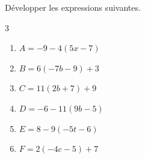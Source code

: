 {%
\begin{Exercice} %
Développer les expressions suivantes.
\vspace{-0.5cm}
\begin{multicols}{3}
\begin{enumerate}[itemsep=2em,label={}]
	\item \begin{minipage}[t]{\linewidth}$A=-9-4(5x-7)$\end{minipage}
	\item \begin{minipage}[t]{\linewidth}$B=6(-7b-9)+3$\end{minipage}
	\item \begin{minipage}[t]{\linewidth}$C=11(2b+7)+9$\end{minipage}
	\item \begin{minipage}[t]{\linewidth}$D=-6-11(9b-5)$\end{minipage}
	\item \begin{minipage}[t]{\linewidth}$E=8-9(-5t-6)$\end{minipage}
	\item \begin{minipage}[t]{\linewidth}$F=2(-4c-5)+7$\end{minipage}
\end{enumerate}
\end{multicols}
\end{Exercice}

}
